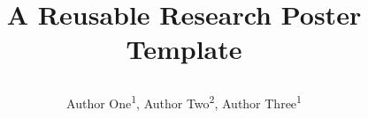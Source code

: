 


\title{\parbox{\linewidth}{\centering A Reusable Research Poster Template}}
\author{Author One\textsuperscript{1}, Author Two\textsuperscript{2}, Author Three\textsuperscript{1}}
\titlegraphicleft{\PosterLeftLogo}
\titlegraphic{\PosterRightLogo}

\newcommand{\PosterRepositoryUrl}{https://github.com/your-org/your-project}
\newcommand{\PosterRepositoryText}{github.com/your-org/your-project}
